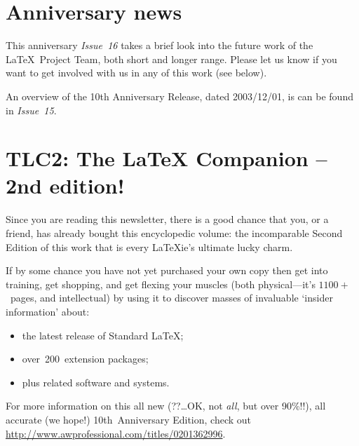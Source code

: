 \documentclass{ltnews}
\begin{document}
\maketitle


\section{Anniversary news}

This anniversary \textit{Issue~16} takes a brief look into the future work of
the \LaTeX\ Project Team, both short and longer range.  Please let
us know if you want %
to get involved with us in any of this work (see below).

An overview of the 10th Anniversary Release, dated 2003/12/01, is
can be found in \textit{Issue~15}.


\section{TLC2: The \LaTeX{} Companion -- 2nd edition!}

Since you are reading this newsletter, there is a good chance that
you, or a friend, has already bought this encyclopedic volume: the
incomparable Second\newline
Edition of this work that is every \LaTeX{}ie's\newline
ultimate lucky charm.

If by some chance you have not yet purchased your own copy then get
into training, get shopping, and get flexing your muscles (both
physical---it's $1100+$~pages,\newline
and intellectual) by using it to discover
masses of invaluable `insider information' about:
\begin{itemize}
\item the latest release of Standard \LaTeX{};
\item over~200~extension packages;
\item plus related software and systems.
\end{itemize}
For more information on this all new (??\ldots OK,\newline
not \emph{all}, but over 90\%!!),
all accurate (we hope!)\newline
10th~Anniversary Edition, check out\newline
 \mbox{\url{http://www.awprofessional.com/titles/0201362996}}.
\end{document}
